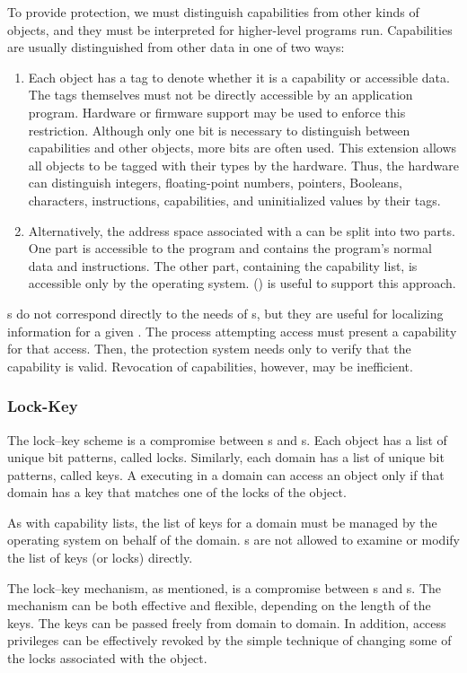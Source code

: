 To provide protection, we must distinguish capabilities from other kinds of objects, and they must be interpreted for higher-level programs run.
Capabilities are usually distinguished from other data in one of two ways:
\begin{enumerate}[noitemsep]
\item Each object has a tag to denote whether it is a capability or accessible data.
  The tags themselves must not be directly accessible by an application program.
  Hardware or firmware support may be used to enforce this restriction.
  Although only one bit is necessary to distinguish between capabilities and other objects, more bits are often used.
  This extension allows all objects to be tagged with their types by the hardware.
  Thus, the hardware can distinguish integers, floating-point numbers, pointers, Booleans, characters, instructions, capabilities, and uninitialized values by their tags.
\item Alternatively, the address space associated with a  can be split into two parts.
  One part is accessible to the program and contains the program’s normal data and instructions.
  The other part, containing the capability list, is accessible only by the operating system.
   () is useful to support this approach.
\end{enumerate}

s do not correspond directly to the needs of s, but they are useful for localizing information for a given .
The process attempting access must present a capability for that access.
Then, the protection system needs only to verify that the capability is valid.
Revocation of capabilities, however, may be inefficient.

\subsubsection{Lock-Key}\label{subsubsec:Lock_Key_Access}
The lock–key scheme is a compromise between s and s.
Each object has a list of unique bit patterns, called locks.
Similarly, each domain has a list of unique bit patterns, called keys.
A  executing in a domain can access an object only if that domain has a key that matches one of the locks of the object.

As with capability lists, the list of keys for a domain must be managed by the operating system on behalf of the domain.
s are not allowed to examine or modify the list of keys (or locks) directly.

The lock–key mechanism, as mentioned, is a compromise between s and s.
The mechanism can be both effective and flexible, depending on the length of the keys.
The keys can be passed freely from domain to domain.
In addition, access privileges can be effectively revoked by the simple technique of changing some of the locks associated with the object.

